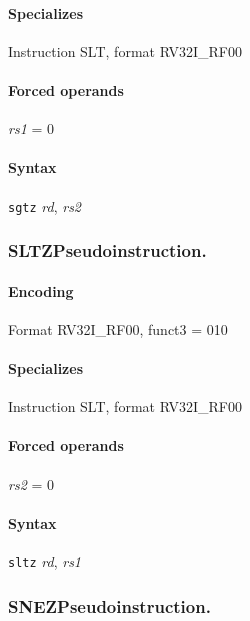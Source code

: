 {


\paragraph{Specializes} Instruction SLT, format RV32I\_RF00

\paragraph{Forced operands} \emph{rs1} = 0

\paragraph{Syntax} \texttt{sgtz} \emph{rd}, \emph{rs2}
\newpage
\subsubsection[{\small SLTZ: Pseudoinstruction.}]{SLTZ\hfill Pseudoinstruction.}
\label{instr:SLTZ}

\paragraph{Encoding} Format \textsf{RV32I\_RF00, funct3 = 010}\\



\paragraph{Specializes} Instruction SLT, format RV32I\_RF00

\paragraph{Forced operands} \emph{rs2} = 0

\paragraph{Syntax} \texttt{sltz} \emph{rd}, \emph{rs1}
\newpage
\subsubsection[{\small SNEZ: Pseudoinstruction.}]{SNEZ\hfill Pseudoinstruction.}
\label{instr:SNEZ}

}
